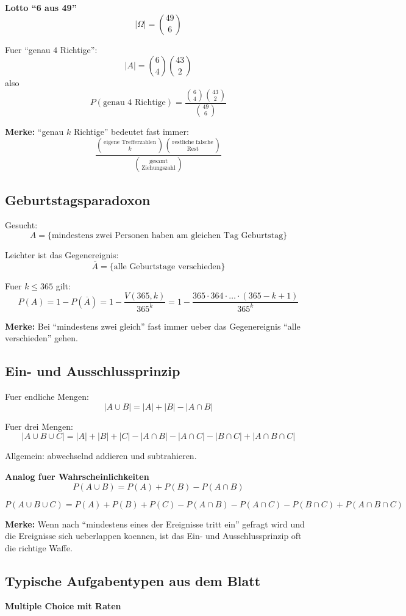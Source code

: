 \documentclass[a4paper,11pt]{article}
\begin{document}
\textbf{Lotto ``6 aus 49''}
\[
|\Omega| = \binom{49}{6}
\]

Fuer ``genau $4$ Richtige'':
\[
|A| = \binom{6}{4}\binom{43}{2}
\]
also
\[
P(\text{genau 4 Richtige}) = \frac{\binom{6}{4}\binom{43}{2}}{\binom{49}{6}}
\]

\textbf{Merke:}
``genau $k$ Richtige'' bedeutet fast immer:
\[
\frac{\binom{\text{eigene Trefferzahlen}}{k}\binom{\text{restliche falsche}}{\text{Rest}}}{\binom{\text{gesamt}}{\text{Ziehungszahl}}}
\]

\subsection{Geburtstagsparadoxon}
Gesucht:
\[
A = \{\text{mindestens zwei Personen haben am gleichen Tag Geburtstag}\}
\]

Leichter ist das Gegenereignis:
\[
\overline{A} = \{\text{alle Geburtstage verschieden}\}
\]

Fuer $k \leq 365$ gilt:
\[
P(A) = 1 - P(\overline{A})
      = 1 - \frac{V(365,k)}{365^k}
      = 1 - \frac{365\cdot 364 \cdot \dots \cdot (365-k+1)}{365^k}
\]

\textbf{Merke:}
Bei ``mindestens zwei gleich'' fast immer ueber das Gegenereignis ``alle verschieden'' gehen.

\subsection{Ein- und Ausschlussprinzip}
Fuer endliche Mengen:
\[
|A \cup B| = |A| + |B| - |A \cap B|
\]

Fuer drei Mengen:
\[
|A \cup B \cup C|
= |A| + |B| + |C|
- |A \cap B| - |A \cap C| - |B \cap C|
+ |A \cap B \cap C|
\]

Allgemein: abwechselnd addieren und subtrahieren.

\textbf{Analog fuer Wahrscheinlichkeiten}
\[
P(A \cup B) = P(A) + P(B) - P(A \cap B)
\]

\[
P(A \cup B \cup C)
= P(A) + P(B) + P(C)
- P(A \cap B) - P(A \cap C) - P(B \cap C)
+ P(A \cap B \cap C)
\]

\textbf{Merke:}
Wenn nach ``mindestens eines der Ereignisse tritt ein'' gefragt wird und die Ereignisse sich ueberlappen koennen, ist das Ein- und Ausschlussprinzip oft die richtige Waffe.

\subsection{Typische Aufgabentypen aus dem Blatt}
\textbf{Multiple Choice mit Raten}
\end{document}
